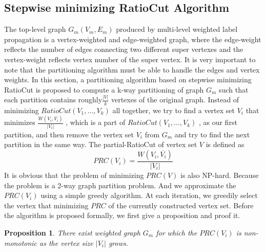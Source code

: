 \documentclass{acm_proc_article-sp}
\begin{document}
\subsection{Stepwise minimizing RatioCut Algorithm}
The top-level graph $G_{m}(V_{m},E_{m})$ produced by multi-level weighted label propagation is a vertex-weighted and edge-weighted graph, where the edge-weight reflects the number of edges connecting two different super vertexes and the vertex-weight reflects vertex number of the super vertex. It is very important to note that the partitioning algorithm must be able to handle the edges and vertex weights. In this section, a partitioning algorithm based on stepwise minimizing RatioCut is proposed to compute a k-way partitioning of graph $G_{m}$ such that each partition contains roughly$\frac{|V|}{k}$ vertexes of the original graph. Instead of minimizing $RatioCut(V_{1},...,V_{k} )$ all together, we try to find a vertex set $V_{i}$ that minimizes $\frac{W(V_{i},\overline{V_{i}})}{|V_{i}|}$ , which is a part of $RatioCut(V_{1},...,V_{k})$ , as our first partition, and then remove the vertex set $V_{i}$ from $G_{m}$ and try to find the next partition in the same way. The partial-RatioCut of vertex set $V$ is defined as
\begin{displaymath}
PRC(V_{i})=\frac{W(V_{i},\overline{V_{i}})}{|V_{i}|}
\end{displaymath}
It is obvious that the problem of minimizing $PRC(V)$ is also NP-hard. Because the problem is a 2-way graph partition problem. And we approximate the $PRC(V_{i})$ using a simple greedy algorithm. At each iteration, we greedily select the vertex that minimizing $PRC$ of the currently constructed vertex set. Before the algorithm is proposed formally, we first give a proposition and proof it.
\newtheorem{proposition}{Proposition}
\begin{proposition}
\label{pro:mono}
There exist weighted graph $G_{m}$ for which the $PRC(V_{i})$ is non-monotonic as the vertex size $|V_{i}|$ grows.
\end{proposition}
\end{document}
